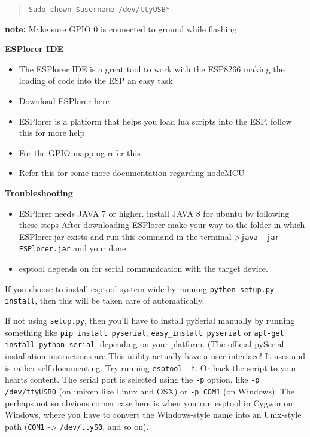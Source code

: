 \documentclass[16pt]{article}
\begin{document}
\begin{quote}
\texttt{Sudo chown \$username /dev/ttyUSB*}
\end{quote}

\textbf{note:} Make sure GPIO 0 is connected to ground while flashing

\textbf{ESPlorer IDE}

\begin{itemize}

\item
  The ESPlorer IDE is a great tool to work with the ESP8266 making the
  loading of code into the ESP an easy task
\item
  Download ESPlorer here
\item
  ESPlorer is a platform that helps you load lua scripts into the ESP.
  follow this for more help
\item
  For the GPIO mapping refer this
\item
  Refer this for some more documentation regarding nodeMCU
\end{itemize}

\textbf{Troubleshooting}

\begin{itemize}

\item
  ESPlorer needs JAVA 7 or higher. install JAVA 8 for ubuntu by
  following these steps
  After downloading ESPlorer make your way to the folder in which
  ESPlorer.jar exists and run this command in the terminal
  \textgreater{}\texttt{java -jar ESPlorer.jar} and your done
\item
  esptool depends on %
  for serial communication with the target device.
\end{itemize}

If you choose to install esptool system-wide by running
\texttt{python setup.py install}, then this will be taken care of
automatically.

If not using \texttt{setup.py}, then you'll have to install pySerial
manually by running something like \texttt{pip install pyserial},
\texttt{easy\_install pyserial} or
\texttt{apt-get install python-serial}, depending on your platform. (The
official pySerial installation instructions are
This utility actually have a user interface! It uses
and
is rather self-documenting. Try running \texttt{esptool -h}. Or hack the
script to your hearts content. The serial port is selected using the
\texttt{-p} option, like \texttt{-p /dev/ttyUSB0} (on unixen like Linux
and OSX) or \texttt{-p COM1} (on Windows). The perhaps not so obvious
corner case here is when you run esptool in Cygwin on Windows, where you
have to convert the Windows-style name into an Unix-style path
(\texttt{COM1} -\textgreater{} \texttt{/dev/ttyS0}, and so on).
\end{document}
